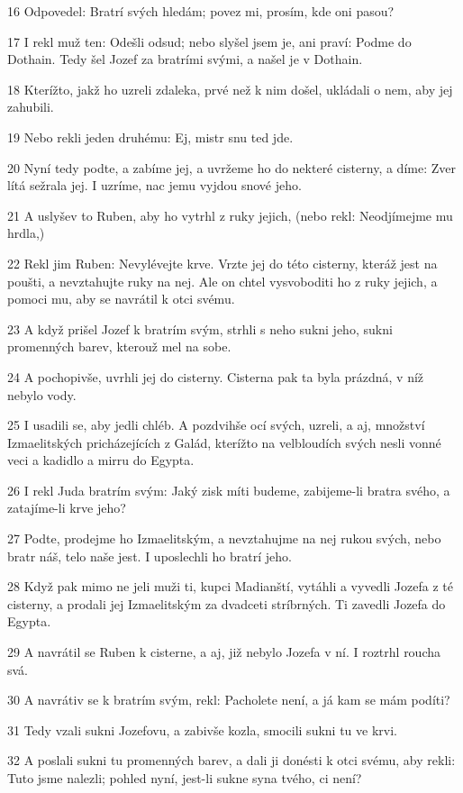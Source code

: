 \par 16 Odpovedel: Bratrí svých hledám; povez mi, prosím, kde oni pasou?
\par 17 I rekl muž ten: Odešli odsud; nebo slyšel jsem je, ani praví: Podme do Dothain. Tedy šel Jozef za bratrími svými, a našel je v Dothain.
\par 18 Kterížto, jakž ho uzreli zdaleka, prvé než k nim došel, ukládali o nem, aby jej zahubili.
\par 19 Nebo rekli jeden druhému: Ej, mistr snu ted jde.
\par 20 Nyní tedy podte, a zabíme jej, a uvržeme ho do nekteré cisterny, a díme: Zver lítá sežrala jej. I uzríme, nac jemu vyjdou snové jeho.
\par 21 A uslyšev to Ruben, aby ho vytrhl z ruky jejich, (nebo rekl: Neodjímejme mu hrdla,)
\par 22 Rekl jim Ruben: Nevylévejte krve. Vrzte jej do této cisterny, kteráž jest na poušti, a nevztahujte ruky na nej. Ale on chtel vysvoboditi ho z ruky jejich, a pomoci mu, aby se navrátil k otci svému.
\par 23 A když prišel Jozef k bratrím svým, strhli s neho sukni jeho, sukni promenných barev, kterouž mel na sobe.
\par 24 A pochopivše, uvrhli jej do cisterny. Cisterna pak ta byla prázdná, v níž nebylo vody.
\par 25 I usadili se, aby jedli chléb. A pozdvihše ocí svých, uzreli, a aj, množství Izmaelitských pricházejících z Galád, kterížto na velbloudích svých nesli vonné veci a kadidlo a mirru do Egypta.
\par 26 I rekl Juda bratrím svým: Jaký zisk míti budeme, zabijeme-li bratra svého, a zatajíme-li krve jeho?
\par 27 Podte, prodejme ho Izmaelitským, a nevztahujme na nej rukou svých, nebo bratr náš, telo naše jest. I uposlechli ho bratrí jeho.
\par 28 Když pak mimo ne jeli muži ti, kupci Madianští, vytáhli a vyvedli Jozefa z té cisterny, a prodali jej Izmaelitským za dvadceti stríbrných. Ti zavedli Jozefa do Egypta.
\par 29 A navrátil se Ruben k cisterne, a aj, již nebylo Jozefa v ní. I roztrhl roucha svá.
\par 30 A navrátiv se k bratrím svým, rekl: Pacholete není, a já kam se mám podíti?
\par 31 Tedy vzali sukni Jozefovu, a zabivše kozla, smocili sukni tu ve krvi.
\par 32 A poslali sukni tu promenných barev, a dali ji donésti k otci svému, aby rekli: Tuto jsme nalezli; pohled nyní, jest-li sukne syna tvého, ci není?
